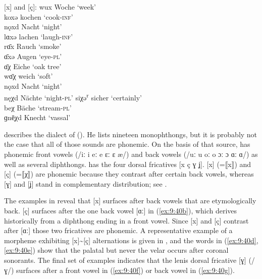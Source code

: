 \ea%
\label{ex:9:39} [x] and [ç]:
\ea\label{ex:9:39a} wux \tab [vux] \tab Woche \tab ‘week’ \\
    koxə\textsuperscript{} \tab [koxə] \tab kochen \tab ‘cook-\textsc{inf}’ \\
    nǫxd \tab [nɔxt] \tab Nacht \tab ‘night’ \\
    lɑxə \tab [lɑxə] \tab lachen \tab ‘laugh-\textsc{inf}’ \\
    rɑ̄x \tab [rɑːx] \tab Rauch \tab ‘smoke’ \\
    ɑ̄xə \tab [ɑːxə] \tab Augen \tab ‘eye-\textsc{pl}’ \\
\ex\label{ex:9:39b} ɑ̄χ \tab  [ɑːç] \tab Eiche \tab ‘oak tree’ \\
    wɑ̄χ \tab [vɑːç] \tab weich \tab ‘soft’ \\
\ex\label{ex:9:39c} nǫxd \tab [nɔxt] \tab Nacht \tab ‘night’ \\
    nęχd \tab [nɛçt] \tab Nächte \tab ‘night-\textsc{pl}’ 
\ex\label{ex:9:39d} siχə\textsuperscript{r} \tab [siçər] \tab sicher \tab ‘certainly’ \\
    beχ \tab [beç] \tab Bäche \tab ‘stream-\textsc{pl}’ \\
    ɡnē̜χd \tab [knɛːçt] \tab Knecht \tab ‘vassal’ 
   \z
\z

\citet{Seibt1930} describes the dialect of  (). He lists nineteen monophthongs, but it is probably not the case that all of those sounds are phonemic. On the basis of that source,  has phonemic front vowels (/iː i eː e ɛː ɛ æ/) and back vowels (/uː u oː o ɔː ɔ ɑː ɑ/) as well as several diphthongs.  has the four dorsal fricatives [x ç ɣ ʝ]. [x] (=⟦x⟧) and [ç] (=⟦χ⟧) are phonemic because they contrast after certain back vowels, whereas [ɣ] and [ʝ] stand in complementary distribution; see .

The examples in  reveal that [x] surfaces after back vowels that are etymologically back. [ç] surfaces after the one back vowel [ɑː] in (\ref{ex:9:40b}), which derives historically from a diphthong ending in a front vowel. Since [x] and [ç] contrast after [ɑː] those two fricatives are phonemic. A representative example of a morpheme exhibiting [x]{\textasciitilde}[ç] alternations is given in , and the words in (\ref{ex:9:40d}, \ref{ex:9:40e}) show that the palatal but never the velar occurs after coronal sonorants. The final set of examples indicates that the lenis dorsal fricative [ɣ] (/ɣ/) surfaces after a front vowel in (\ref{ex:9:40f}) or back vowel in (\ref{ex:9:40g}).

